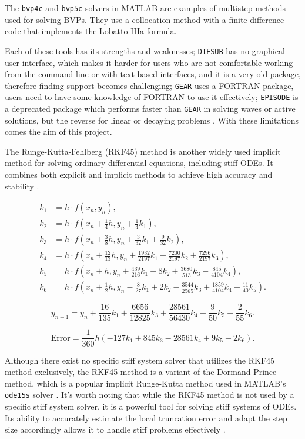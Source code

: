 The \texttt{bvp4c} and \texttt{bvp5c} solvers in MATLAB are examples of multistep methods used for solving BVPs. They use a collocation method with a finite difference code that implements the Lobatto IIIa formula.

Each of these tools has its strengths and weaknesses; \texttt{DIFSUB} has no graphical user interface, which makes it harder for users who are not comfortable working from the command-line or with text-based interfaces, and it is a very old package, therefore finding support becomes challenging; \texttt{GEAR} uses a FORTRAN package, users need to have some knowledge of FORTRAN to use it effectively; \texttt{EPISODE} is a deprecated package which performs faster than \texttt{GEAR} in solving waves or active solutions, but the reverse for linear or decaying problems \cite{BYRNE1977125}. With these limitations comes the aim of this project.

The Runge-Kutta-Fehlberg (RKF45) method is another widely used implicit method for solving ordinary differential equations, including stiff ODEs. It combines both explicit and implicit methods to achieve high accuracy and stability \cite{stone2017accelerating}.

\[
\begin{aligned}
  k_1 & = h \cdot f(x_n, y_n), \\
  k_2 & = h \cdot f\left(x_n + \frac{1}{4}h, y_n + \frac{1}{4}k_1\right), \\
  k_3 & = h \cdot f\left(x_n + \frac{3}{8}h, y_n + \frac{3}{32}k_1 + \frac{9}{32}k_2\right), \\
  k_4 & = h \cdot f\left(x_n + \frac{12}{13}h, y_n + \frac{1932}{2197}k_1 - \frac{7200}{2197}k_2 + \frac{7296}{2197}k_3\right), \\
  k_5 & = h \cdot f\left(x_n + h, y_n + \frac{439}{216}k_1 - 8k_2 + \frac{3680}{513}k_3 - \frac{845}{4104}k_4\right), \\
  k_6 & = h \cdot f\left(x_n + \frac{1}{2}h, y_n - \frac{8}{27}k_1 + 2k_2 - \frac{3544}{2565}k_3 + \frac{1859}{4104}k_4 - \frac{11}{40}k_5\right).
\end{aligned}
\]

\[
y_{n+1} = y_n + \frac{16}{135}k_1 + \frac{6656}{12825}k_3 + \frac{28561}{56430}k_4 - \frac{9}{50}k_5 + \frac{2}{55}k_6.
\]

\[
\text{Error} = \frac{1}{360}h(-127k_1 + 845k_3 - 28561k_4 + 9k_5 - 2k_6).
\]

Although there exist no specific stiff system solver that utilizes the RKF45 method exclusively, the RKF45 method is a variant of the Dormand-Prince method, which is a popular implicit Runge-Kutta method used in MATLAB's \texttt{ode15s} solver \cite{BurkardtRKF45}. It's worth noting that while the RKF45 method is not used by a specific stiff system solver, it is a powerful tool for solving stiff systems of ODEs. Its ability to accurately estimate the local truncation error and adapt the step size accordingly allows it to handle stiff problems effectively \cite{BurkardtRKF45}.

